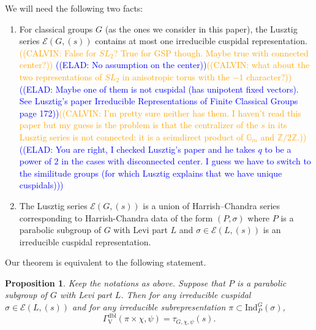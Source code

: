 \documentclass[12pt, reqno]{amsart}
\newtheorem{proposition}[theorem]{Proposition}
\theoremstyle{definition}
\theoremstyle{definition}
\theoremstyle{definition}
\newcommand{\hermitianSpace}{\mathrm{V}}
\newcommand{\fieldCharacter}{\psi}
\newcommand{\Ind}[3]{\mathrm{Ind}_{#1}^{#2}\left(#3\right)}
\newcommand{\dblGammaFactorSpace}[4]{\Gamma^{\mathrm{dbl}}_{#1}\left(#2 \times #3, #4\right)}
\newcommand{\LusztigSeries}[2]{\mathcal{E}\left(#1, (#2)\right)}
\newcommand{\calvin}[1]{\textcolor{orange}{\sffamily ((CALVIN: #1))}}
\newcommand{\elad}[1]{\textcolor{blue}{\sffamily ((ELAD: #1))}}
\begin{document}
We will need the following two facts:
\begin{enumerate}
	\item For classical groups $G$ (as the ones we consider in this paper), the Lusztig series $\LusztigSeries{G}{s}$ contains at most one irreducible cuspidal representation. \calvin{False for $SL_2$? True for GSP though. Maybe true with connected center?}
    \elad{No assumption on the center}\calvin{what about the two representations of $SL_2$ in anisotropic torus with the $-1$ character?}\elad{Maybe one of them is not cuspidal (has unipotent fixed vectors). See Lusztig's paper Irreducible Representations of Finite Classical Groups page 172}\calvin{I'm pretty sure neither has them. I haven't read this paper but my guess is the problem is that the centralizer of the $s$ in its Lusztig series is not connected: it is a seimdirect product of $\mathbb{G}_m$ and $\mathbb{Z}/2\mathbb{Z}$.}\elad{You are right, I checked Lusztig's paper and he takes $q$ to be a power of $2$ in the cases with disconnected center. I guess we have to switch to the similitude groups (for which Lusztig explains that we have unique cuspidals)}
	\item The Lusztig series $\LusztigSeries{G}{s}$ is a union of Harrish--Chandra series corresponding to Harrish-Chandra data of the form $\left(P,\sigma\right)$ where $P$ is a parabolic subgroup of $G$ with Levi part $L$ and $\sigma \in \LusztigSeries{L}{s}$ is an irreducible cuspidal representation.
\end{enumerate}
Our theorem is equivalent to the following statement.
\begin{proposition}
	Keep the notations as above. Suppose that $P$ is a parabolic subgroup of $G$ with Levi part $L$. Then for any irreducible cuspidal $\sigma \in \LusztigSeries{L}{s}$ and for any irreducible subrepresentation $\pi \subset \Ind{P}{G}{\sigma}$, $$\dblGammaFactorSpace{\hermitianSpace}{\pi}{\chi}{\fieldCharacter} = \tau_{G, \chi, \fieldCharacter}\left(s\right).$$
\end{proposition}
\end{document}
